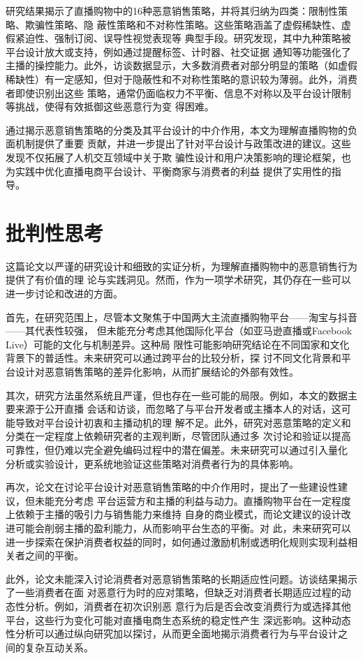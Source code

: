 \documentclass{article}
\begin{document}
研究结果揭示了直播购物中的16种恶意销售策略，并将其归纳为四类：限制性策略、欺骗性策略、隐
蔽性策略和不对称性策略。这些策略涵盖了虚假稀缺性、虚假紧迫性、强制订阅、误导性视觉表现等
典型手段。研究发现，其中九种策略被平台设计放大或支持，例如通过提醒标签、计时器、社交证据
通知等功能强化了主播的操控能力。此外，访谈数据显示，大多数消费者对部分明显的策略（如虚假
稀缺性）有一定感知，但对于隐蔽性和不对称性策略的意识较为薄弱。此外，消费者即使识别出这些
策略，通常仍面临权力不平衡、信息不对称以及平台设计限制等挑战，使得有效抵御这些恶意行为变
得困难。

通过揭示恶意销售策略的分类及其平台设计的中介作用，本文为理解直播购物的负面机制提供了重要
贡献，并进一步提出了针对平台设计与政策改进的建议。这些发现不仅拓展了人机交互领域中关于欺
骗性设计和用户决策影响的理论框架，也为实践中优化直播电商平台设计、平衡商家与消费者的利益
提供了实用性的指导。
	
	
	\section*{批判性思考}
这篇论文以严谨的研究设计和细致的实证分析，为理解直播购物中的恶意销售行为提供了有价值的理
论与实践洞见。然而，作为一项学术研究，其仍存在一些可以进一步讨论和改进的方面。

首先，在研究范围上，尽管本文聚焦于中国两大主流直播购物平台——淘宝与抖音——其代表性较强，
但未能充分考虑其他国际化平台（如亚马逊直播或Facebook Live）可能的文化与机制差异。这种局
限性可能影响研究结论在不同国家和文化背景下的普适性。未来研究可以通过跨平台的比较分析，探
讨不同文化背景和平台设计对恶意销售策略的差异化影响，从而扩展结论的外部有效性。

其次，研究方法虽然系统且严谨，但也存在一些可能的局限。例如，本文的数据主要来源于公开直播
会话和访谈，而忽略了与平台开发者或主播本人的对话，这可能导致对平台设计初衷和主播动机的理
解不足。此外，研究对恶意策略的定义和分类在一定程度上依赖研究者的主观判断，尽管团队通过多
次讨论和验证以提高可靠性，但仍难以完全避免编码过程中的潜在偏差。未来研究可以通过引入量化
分析或实验设计，更系统地验证这些策略对消费者行为的具体影响。

再次，论文在讨论平台设计对恶意销售策略的中介作用时，提出了一些建设性建议，但未能充分考虑
平台运营方和主播的利益与动力。直播购物平台在一定程度上依赖于主播的吸引力与销售能力来维持
自身的商业模式，而论文建议的设计改进可能会削弱主播的盈利能力，从而影响平台生态的平衡。对
此，未来研究可以进一步探索在保护消费者权益的同时，如何通过激励机制或透明化规则实现利益相
关者之间的平衡。

此外，论文未能深入讨论消费者对恶意销售策略的长期适应性问题。访谈结果揭示了一些消费者在面
对恶意行为时的应对策略，但缺乏对消费者长期适应过程的动态性分析。例如，消费者在初次识别恶
意行为后是否会改变消费行为或选择其他平台，这些行为变化可能对直播电商生态系统的稳定性产生
深远影响。这种动态性分析可以通过纵向研究加以探讨，从而更全面地揭示消费者行为与平台设计之
间的复杂互动关系。
\end{document}
